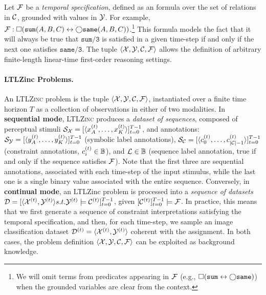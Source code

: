 Let ${\mathcal{F}}$ be a \textit{temporal specification}, defined as an \LTLf formula over the set of relations in ${\mathcal{C}}$,  grounded with values in ${\mathcal{Y}}$. For example, ${\mathcal{F}}: \Box(\texttt{sum}(A,B,C) \leftrightarrow \bigcirc \texttt{same}(A,B,C))$.\footnote{We will omit terms from predicates appearing in ${\mathcal{F}}$ (e.g., $\Box(\texttt{sum} \leftrightarrow \bigcirc \texttt{same})$) when the grounded variables are clear from the context.} This formula models the fact that it will always be true that $\texttt{sum/3}$ is satisfied in a given time-step if and only if the next one satisfies $\texttt{same/3}$. 
The tuple $\langle {\mathcal{X}}, {\mathcal{Y}}, {\mathcal{C}}, {\mathcal{F}} \rangle$ allows the definition of arbitrary finite-length linear-time first-order reasoning settings.

\paragraph{LTLZinc Problems.} An \textsc{LTLZinc} problem is the tuple $\langle {\mathcal{X}}, {\mathcal{Y}}, {\mathcal{C}}, {\mathcal{F}}\rangle$, instantiated over a finite time horizon $T$ as a collection of observations in either of two modalities.
In \textbf{sequential mode}, \textsc{LTLZinc} produces a \textit{dataset of sequences}, composed of perceptual stimuli ${\mathcal{S}}_{\mathcal{X}} = [\langle x_A^{(t)}, \dots, x_{K}^{(t)}\rangle]_{t=0}^{T-1}$, and annotations: ${\mathcal{S}}_{\mathcal{Y}} = [\langle y_A^{(t)}, \dots, y_{K}^{(t)}\rangle]_{t=0}^{T-1}$ (symbolic label annotations), ${\mathcal{S}}_{\mathcal{C}} = [\langle c_0^{(t)}, \dots, c_{|{\mathcal{C}}|-1}^{(t)}\rangle]_{t=0}^{T-1}$ (constraint annotations, $c_i^{(t)} \in {\mathbb{B}}$), and ${\mathcal{L}} \in {\mathbb{B}}$ (sequence label annotation, true if and only if the sequence satisfies ${\mathcal{F}}$). Note that the first three are sequential annotations, associated with each time-step of the input stimulus, while the last one is a single binary value associated with the entire sequence. 
%
Conversely, in \textbf{continual mode}, an LTLZinc problem is processed into a \textit{sequence of datasets} $\mathcal{D} = [\langle {\mathcal{X}}^{(t)}, {\mathcal{Y}}^{(t)} \rangle s.t. {\mathcal{Y}}^{(t)} \models {\mathcal{C}}^{(t)}]_{t=0}^{T-1}$, given $[{\mathcal{C}}^{(t)}]_{t=0}^{T-1} \models {\mathcal{F}}$.
In practice, this means that we first generate a sequence of constraint interpretations satisfying the temporal specification, and then, for each time-step, we sample an image classification dataset ${\mathcal{D}}^{(t)} = \langle {\mathcal{X}}^{(t)}, {\mathcal{Y}}^{(t)}\rangle$ coherent with the assignment.
%
In both cases, the problem definition $\langle {\mathcal{X}}, {\mathcal{Y}}, {\mathcal{C}}, {\mathcal{F}}\rangle$ can be exploited as background knowledge.

